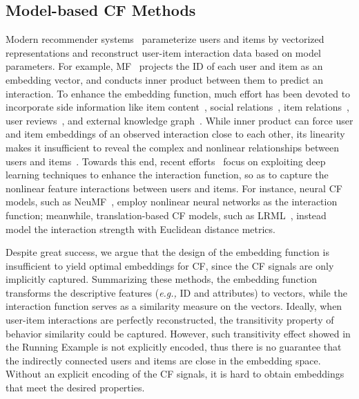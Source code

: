 \documentclass[sigconf]{acmart}
\newcommand{\eg}{\emph{e.g., }}
\theoremstyle{definition}
\begin{document}
\subsection{Model-based CF Methods}
Modern recommender systems~\cite{NCF,CMN,TEM} parameterize users and items by vectorized representations and reconstruct user-item interaction data based on model parameters.
For example, MF~\cite{MF,BPRMF} projects the ID of each user and item as an embedding vector, and conducts inner product between them to predict an interaction.
To enhance the embedding function, much effort has been devoted to incorporate side information like item content~\cite{CDL,ACF}, social relations~\cite{ItemSilk}, item relations~\cite{RCF}, user reviews~\cite{DBLP:conf/www/ChengDZK18}, and external knowledge graph~\cite{KGAT,KPRN}.
While inner product can force user and item embeddings of an observed interaction close to each other, its linearity makes it insufficient to reveal the complex and nonlinear relationships between users and items~\cite{NCF,CML}.
Towards this end, recent efforts~\cite{AutoCF,NCF,CML,NFM} focus on exploiting deep learning techniques to enhance the interaction function, so as to capture the nonlinear feature interactions between users and items.
For instance, neural CF models, such as NeuMF~\cite{NCF}, employ nonlinear neural networks as the interaction function;
meanwhile, translation-based CF models, such as LRML~\cite{tay2018latent}, instead model the interaction strength with Euclidean distance metrics.

Despite great success, we argue that the design of the embedding function is insufficient to yield optimal embeddings for CF, since the CF signals are only implicitly captured.
Summarizing these methods, the embedding function transforms the descriptive features (\eg ID and attributes) to vectors, while the interaction function serves as a similarity measure on the vectors.
Ideally, when user-item interactions are perfectly reconstructed, the transitivity property of behavior similarity could be captured.
However, such transitivity effect showed in the Running Example is not explicitly encoded, thus there is no guarantee that the indirectly connected users and items are close in the embedding space.
Without an explicit encoding of the CF signals, it is hard to obtain embeddings that meet the desired properties. 
\end{document}
